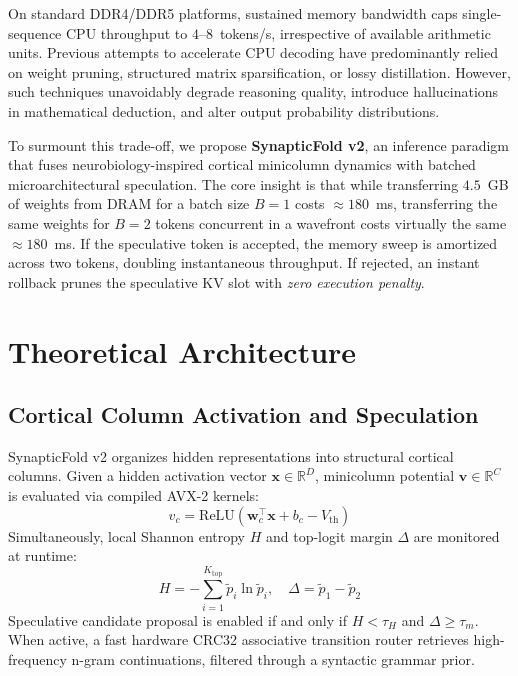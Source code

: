 \documentclass[journal,10pt,twocolumn]{article}
\theoremstyle{definition}
\begin{document}
On standard DDR4/DDR5 platforms, sustained memory bandwidth caps single-sequence CPU throughput to $4\text{--}8$~tokens/s, irrespective of available arithmetic units. Previous attempts to accelerate CPU decoding have predominantly relied on weight pruning, structured matrix sparsification, or lossy distillation. However, such techniques unavoidably degrade reasoning quality, introduce hallucinations in mathematical deduction, and alter output probability distributions.

To surmount this trade-off, we propose \textbf{SynapticFold v2}, an inference paradigm that fuses neurobiology-inspired cortical minicolumn dynamics with batched microarchitectural speculation. The core insight is that while transferring $4.5$~GB of weights from DRAM for a batch size $B=1$ costs $\approx 180$~ms, transferring the same weights for $B=2$ tokens concurrent in a wavefront costs virtually the same $\approx 180$~ms. If the speculative token is accepted, the memory sweep is amortized across two tokens, doubling instantaneous throughput. If rejected, an instant rollback prunes the speculative KV slot with \textit{zero execution penalty}.

\section{Theoretical Architecture}

\subsection{Cortical Column Activation and Speculation}
SynapticFold v2 organizes hidden representations into structural cortical columns. Given a hidden activation vector $\mathbf{x} \in \mathbb{R}^D$, minicolumn potential $\mathbf{v} \in \mathbb{R}^C$ is evaluated via compiled AVX-2 kernels:
\begin{equation}
v_c = \text{ReLU}\left( \mathbf{w}_c^\top \mathbf{x} + b_c - V_{\text{th}} \right)
\end{equation}
Simultaneously, local Shannon entropy $H$ and top-logit margin $\Delta$ are monitored at runtime:
\begin{equation}
H = -\sum_{i=1}^{K_{\text{top}}} \tilde{p}_i \ln \tilde{p}_i, \quad \Delta = \tilde{p}_1 - \tilde{p}_2
\end{equation}
Speculative candidate proposal is enabled if and only if $H < \tau_H$ and $\Delta \ge \tau_m$. When active, a fast hardware CRC32 associative transition router retrieves high-frequency n-gram continuations, filtered through a syntactic grammar prior.
\end{document}
